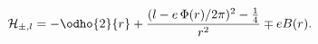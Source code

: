 \begin{equation}
\label{Eq_0208}
\mathcal{H}_{\pm,l} = - \odho{2}{r}
	+ \frac{(l - e \, \Phi(r) / 2\pi)^2 - \frac{1}{4}}{r^2} \mp e B(r).
\end{equation}

